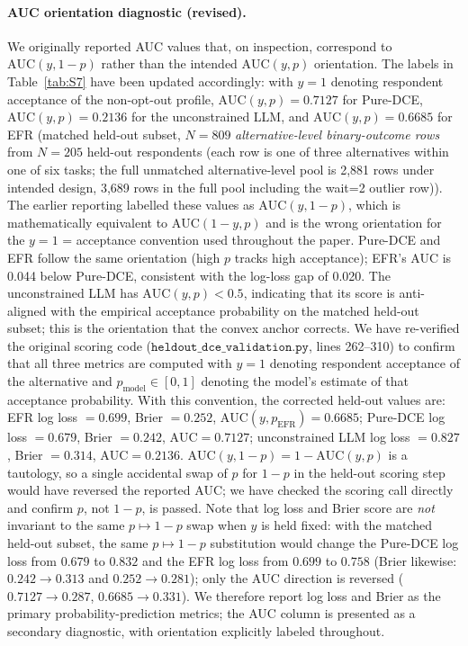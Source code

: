 \documentclass[11pt]{article}
\begin{document}
\paragraph{AUC orientation diagnostic (revised).}
We originally reported AUC values that, on inspection, correspond to $\mathrm{AUC}(y, 1-p)$ rather than the intended $\mathrm{AUC}(y, p)$ orientation. The labels in Table~\ref{tab:S7} have been updated accordingly: with $y=1$ denoting respondent acceptance of the non-opt-out profile, $\mathrm{AUC}(y, p) = 0.7127$ for Pure-DCE, $\mathrm{AUC}(y, p) = 0.2136$ for the unconstrained LLM, and $\mathrm{AUC}(y, p) = 0.6685$ for EFR (matched held-out subset, $N=809$ \emph{alternative-level binary-outcome rows} from $N=205$ held-out respondents (each row is one of three alternatives within one of six tasks; the full unmatched alternative-level pool is 2{,}881 rows under intended design, 3{,}689 rows in the full pool including the wait=2 outlier row)). The earlier reporting labelled these values as $\mathrm{AUC}(y, 1-p)$, which is mathematically equivalent to $\mathrm{AUC}(1-y, p)$ and is the wrong orientation for the $y=1$ = acceptance convention used throughout the paper. Pure-DCE and EFR follow the same orientation (high $p$ tracks high acceptance); EFR's AUC is 0.044 below Pure-DCE, consistent with the log-loss gap of 0.020. The unconstrained LLM has $\mathrm{AUC}(y, p) < 0.5$, indicating that its score is anti-aligned with the empirical acceptance probability on the matched held-out subset; this is the orientation that the convex anchor corrects. We have re-verified the original scoring code ($\texttt{heldout\_dce\_validation.py}$, lines 262--310) to confirm that all three metrics are computed with $y=1$ denoting respondent acceptance of the alternative and $p_\mathrm{model} \in [0,1]$ denoting the model's estimate of that acceptance probability. With this convention, the corrected held-out values are: EFR log loss $= 0.699$, Brier $= 0.252$, $\mathrm{AUC}(y, p_\mathrm{EFR}) = 0.6685$; Pure-DCE log loss $= 0.679$, Brier $= 0.242$, $\mathrm{AUC} = 0.7127$; unconstrained LLM log loss $= 0.827$, Brier $= 0.314$, $\mathrm{AUC} = 0.2136$. $\mathrm{AUC}(y, 1-p) = 1 - \mathrm{AUC}(y, p)$ is a tautology, so a single accidental swap of $p$ for $1-p$ in the held-out scoring step would have reversed the reported AUC; we have checked the scoring call directly and confirm $p$, not $1-p$, is passed. Note that log loss and Brier score are \emph{not} invariant to the same $p \mapsto 1-p$ swap when $y$ is held fixed: with the matched held-out subset, the same $p \mapsto 1-p$ substitution would change the Pure-DCE log loss from $0.679$ to $0.832$ and the EFR log loss from $0.699$ to $0.758$ (Brier likewise: $0.242 \to 0.313$ and $0.252 \to 0.281$); only the $\mathrm{AUC}$ direction is reversed ($0.7127 \to 0.287$, $0.6685 \to 0.331$). We therefore report log loss and Brier as the primary probability-prediction metrics; the AUC column is presented as a secondary diagnostic, with orientation explicitly labeled throughout.
\end{document}
